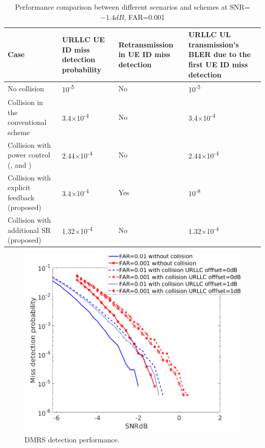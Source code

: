 \documentclass[conference]{IEEEtran}
\begin{document}
\begin{table}[htbp]
\caption{Performance comparison between different scenarios and schemes at SNR=$-1.4dB$, FAR=0.001}
\begin{center}
\begin{tabular}{|p{19em}|p{9em}|p{10em}|p{16em}|}
 \hline
 \textbf{Case} & \textbf{URLLC UE ID miss detection probability}& \textbf{Retransmission in UE ID miss detection}& \textbf{URLLC UL transmission's BLER due to the first UE ID miss detection}\\
 \hline
 No collision  & 10\textsuperscript{-5}&No&10\textsuperscript{-5}\\
 \hline
 Collision in the conventional scheme& 3.4$\times$10\textsuperscript{-4}&No&3.4$\times$10\textsuperscript{-4}\\
 \hline
 Collision with power control (\cite{b1}, \cite{b2} and \cite{b3})&2.44$\times$10\textsuperscript{-4}&No&2.44$\times$10\textsuperscript{-4}\\
 \hline
 Collision with explicit feedback (proposed)& 3.4$\times$10\textsuperscript{-4}&Yes&10\textsuperscript{-8}\\
\hline
 Collision with additional SR (proposed)& 1.32$\times$10\textsuperscript{-4}&No&1.32$\times$10\textsuperscript{-4}\\

 
 \hline
\end{tabular}
\label{tab2}
\end{center}
\vspace{-8mm}
\end{table}

\begin{figure}[htbp]
\centerline{\includegraphics[scale=0.35]{fig5.png}}
\caption{DMRS detection performance.}
\label{fig5}
\vspace{-4mm}
\end{figure}
\end{document}
